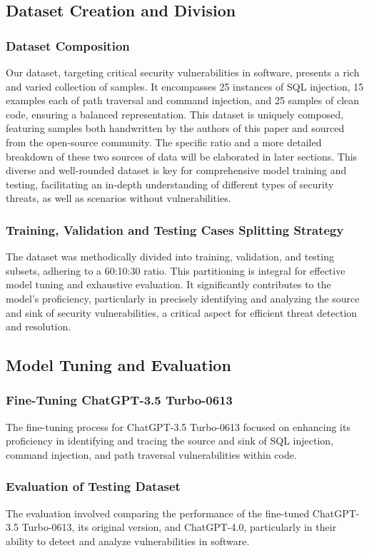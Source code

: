 \documentclass[acmsmall]{acmart}
\begin{document}
\subsection{Dataset Creation and Division}
\subsubsection{Dataset Composition}
Our dataset, targeting critical security vulnerabilities in software, presents a rich and varied collection of samples. It encompasses 25 instances of SQL injection, 15 examples each of path traversal and command injection, and 25 samples of clean code, ensuring a balanced representation. This dataset is uniquely composed, featuring samples both handwritten by the authors of this paper and sourced from the open-source community. The specific ratio and a more detailed breakdown of these two sources of data will be elaborated in later sections. This diverse and well-rounded dataset is key for comprehensive model training and testing, facilitating an in-depth understanding of different types of security threats, as well as scenarios without vulnerabilities.
\subsubsection{Training, Validation and Testing Cases Splitting Strategy}
The dataset was methodically divided into training, validation, and testing subsets, adhering to a 60:10:30 ratio. This partitioning is integral for effective model tuning and exhaustive evaluation. It significantly contributes to the model's proficiency, particularly in precisely identifying and analyzing the source and sink of security vulnerabilities, a critical aspect for efficient threat detection and resolution.

\subsection{Model Tuning and Evaluation}
\subsubsection{Fine-Tuning ChatGPT-3.5 Turbo-0613}
The fine-tuning process for ChatGPT-3.5 Turbo-0613 focused on enhancing its proficiency in identifying and tracing the source and sink of SQL injection, command injection, and path traversal vulnerabilities within code.
\subsubsection{Evaluation of Testing Dataset}
The evaluation involved comparing the performance of the fine-tuned ChatGPT-3.5 Turbo-0613, its original version, and ChatGPT-4.0, particularly in their ability to detect and analyze vulnerabilities in software.
\end{document}
